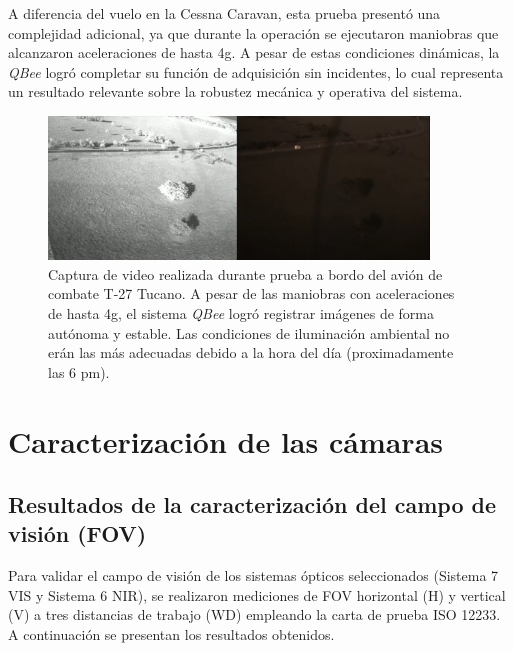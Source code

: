     \noindent A diferencia del vuelo en la Cessna Caravan, esta prueba presentó una complejidad adicional, ya que durante la operación se ejecutaron maniobras que alcanzaron aceleraciones de hasta 4g. A pesar de estas condiciones dinámicas, la \textit{QBee} logró completar su función de adquisición sin incidentes, lo cual representa un resultado relevante sobre la robustez mecánica y operativa del sistema.
    
    \begin{figure}[!h]
    \centering
    \includegraphics[width=0.9\textwidth]{Figures/C4/t2.png}
    \caption{Captura de video realizada durante prueba a bordo del avión de combate T-27 Tucano. A pesar de las maniobras con aceleraciones de hasta 4g, el sistema \textit{QBee} logró registrar imágenes de forma autónoma y estable. Las condiciones de iluminación ambiental no erán las más adecuadas debido a la hora del día (proximadamente las 6 pm).}
    \label{fig:prueba_tucano}
    \end{figure}
    

\section{Caracterización de las cámaras}
     \subsection{Resultados de la caracterización del campo de visión (FOV)}
     \label{sec:fov_resultados}
     
     Para validar el campo de visión de los sistemas ópticos seleccionados (Sistema 7 VIS y Sistema 6 NIR), se realizaron mediciones de FOV horizontal (H) y vertical (V) a tres distancias de trabajo (\(\mathrm{WD}\)) empleando la carta de prueba ISO 12233. A continuación se presentan los resultados obtenidos.\\
     
